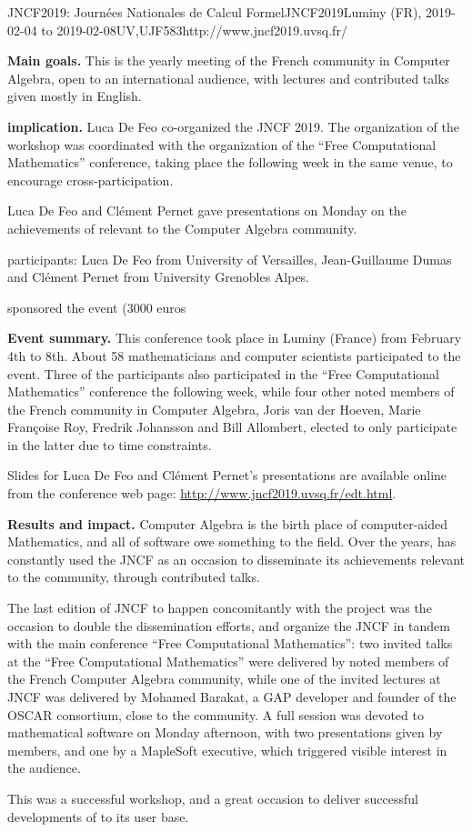 \begin{event}{JNCF2019: Journées Nationales de Calcul Formel}{JNCF2019}{Luminy (FR),
  2019-02-04 to
  2019-02-08}{UV,UJF}{58}{3}{http://www.jncf2019.uvsq.fr/}
  
\textbf{Main goals.} This is the yearly meeting of the French community in
Computer Algebra, open to an international audience, with lectures and
contributed talks given mostly in English.

\textbf{\ODK implication.} Luca De Feo co-organized the JNCF 2019. The
organization of the workshop was coordinated with the organization of
the ``Free Computational Mathematics'' conference, taking place the
following week in the same venue, to encourage cross-participation.

Luca De Feo and Clément Pernet gave presentations on Monday on the
achievements of \ODK relevant to the Computer Algebra
community.

\ODK participants: Luca De Feo from University of Versailles,
Jean-Guillaume Dumas and Clément Pernet from University Grenobles
Alpes.

\ODK sponsored the event (3000 euros %

\textbf{Event summary.} This conference took place in Luminy (France) from
February 4th to 8th. About 58 mathematicians and computer scientists
participated to the event. Three of the participants also participated
in the ``Free Computational Mathematics'' conference the following
week, while four other noted members of the French community in
Computer Algebra, Joris van der Hoeven, Marie Françoise Roy, Fredrik
Johansson and Bill Allombert, elected to only participate in the latter
due to time constraints.

Slides for Luca De Feo and Clément Pernet's presentations are
available online from the conference web page:
\url{http://www.jncf2019.uvsq.fr/edt.html}.

\textbf{Results and impact.} Computer Algebra is the birth place of
computer-aided Mathematics, and all of \ODK software owe something to
the field. Over the years, \ODK has constantly used the JNCF as an
occasion to disseminate its achievements relevant to the community,
through contributed talks.

The last edition of JNCF to happen concomitantly with the project was
the occasion to double the dissemination efforts, and organize the
JNCF in tandem with the main \ODK conference ``Free Computational
Mathematics'': two invited talks at the ``Free Computational
Mathematics'' were delivered by noted members of the French Computer
Algebra community, while one of the invited lectures at JNCF was
delivered by Mohamed Barakat, a GAP developer and founder of the OSCAR
consortium, close to the \ODK community. A full session was devoted to
mathematical software on Monday afternoon, with two presentations
given by \ODK members, and one by a MapleSoft executive, which
triggered visible interest in the audience.

This was a successful workshop, and a great occasion to deliver 
successful developments of \ODK to its user base.
\end{event}
